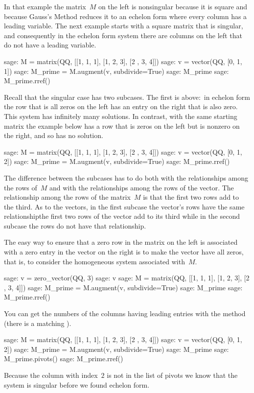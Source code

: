 In that example the matrix~$M$ on the left is nonsingular because it is 
square and because Gauss's Method reduces it to an 
echelon form where every
column has a leading variable.
The next example starts with a
square matrix that is singular, and consequently in the  
echelon form system there are columns on the left 
that do not have a leading variable. 
\begin{sagecommandline}
sage: M = matrix(QQ, [[1, 1, 1], [1, 2, 3], [2 , 3, 4]])    
sage: v = vector(QQ, [0, 1, 1]) 
sage: M_prime = M.augment(v, subdivide=True)
sage: M_prime
sage: M_prime.rref()
\end{sagecommandline}
\noindent
Recall that the singular case has two subcases.
The first is above:~in echelon form
the row that is all zeros on the
left has an entry on the right that is also zero.
This system has infinitely many solutions.
In contrast, with the same starting matrix
the example below has a row that is zeros on the left but is nonzero
on the right, and so has no solution.
\begin{sagecommandline}
sage: M = matrix(QQ, [[1, 1, 1], [1, 2, 3], [2 , 3, 4]])    
sage: v = vector(QQ, [0, 1, 2])             
sage: M_prime = M.augment(v, subdivide=True)
sage: M_prime.rref()                        
\end{sagecommandline}

The difference between the subcases
has to do both with the relationships among  
the rows of~$M$ and with the relationships among the rows of the vector.
The relationship among the rows of the matrix~$M$
is that the first two rows add to the third.
As to the vectors, in the first subcase the vector's rows have the same 
relationship\Dash the first two rows of the vector add to its third\Dash  
while in the second subcase the rows do not have that relationship.

The easy way to ensure that a zero row in the matrix 
on the left is associated with a zero
entry in the vector on the right is to make the vector have all zeros, that is,
to consider the homogeneous system associated with~$M$.
\begin{sagecommandline}
sage: v = zero_vector(QQ, 3)
sage: v
sage: M = matrix(QQ, [[1, 1, 1], [1, 2, 3], [2 , 3, 4]]) 
sage: M_prime = M.augment(v, subdivide=True)
sage: M_prime
sage: M_prime.rref()
\end{sagecommandline}

You can get the numbers of the columns having leading entries with 
the  method
(there is a matching ).
\begin{sagecommandline}
sage: M = matrix(QQ, [[1, 1, 1], [1, 2, 3], [2 , 3, 4]]) 
sage: v = vector(QQ, [0, 1, 2])
sage: M_prime = M.augment(v, subdivide=True)
sage: M_prime                  
sage: M_prime.pivots()         
sage: M_prime.rref()
\end{sagecommandline}
\noindent
Because the column with index~$2$ 
is not in the list of pivots we know that the
system is singular before we found echelon form.

